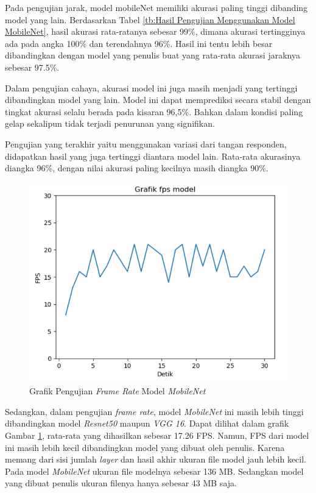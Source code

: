 Pada pengujian jarak, model mobileNet memiliki akurasi paling tinggi dibanding model yang lain. Berdasarkan Tabel \ref{tb:Hasil Pengujian Menggunakan Model MobileNet}, hasil akurasi rata-ratanya sebesar 99\%, dimana akurasi tertingginya ada pada angka 100\% dan terendahnya 96\%. Hasil ini tentu lebih besar dibandingkan dengan model yang penulis buat yang rata-rata akurasi jaraknya sebesar 97.5\%.

Dalam pengujian cahaya, akurasi model ini juga masih menjadi yang tertinggi dibandingkan model yang lain. Model ini dapat memprediksi secara stabil dengan tingkat akurasi selalu berada pada kisaran 96,5\%. Bahkan dalam kondisi paling gelap sekalipun tidak terjadi penurunan yang signifikan. 

Pengujian yang terakhir yaitu menggunakan variasi dari tangan responden, didapatkan hasil yang juga tertinggi diantara model lain. Rata-rata akurasinya diangka 96\%, dengan nilai akurasi paling kecilnya masih diangka 90\%.

\begin{figure}[!htb]
  \centering
  \includegraphics[scale=0.8]{gambar/pengujian-fps/grafik-pengujian-fps-mobilenet.png}
  \caption{Grafik Pengujian \emph{Frame Rate} Model \emph{MobileNet}}
  \label{fig:Grafik Pengujian Frame Rate Model MobileNet}
\end{figure}

Sedangkan, dalam pengujian \emph{frame rate}, model \emph{MobileNet} ini masih lebih tinggi dibandingkan model \emph{Resnet50} maupun \emph{VGG 16}. Dapat dilihat dalam grafik Gambar \ref{fig:Grafik Pengujian Frame Rate Model MobileNet}, rata-rata yang dihasilkan sebesar 17.26 FPS. Namun, FPS dari model ini masih lebih kecil dibandingkan model yang dibuat oleh penulis. Karena memang dari sisi jumlah \emph{layer} dan hasil akhir ukuran file model jauh lebih kecil. Pada model \emph{MobileNet} ukuran file modelnya sebesar 136 MB. Sedangkan model yang dibuat penulis ukuran filenya hanya sebesar 43 MB saja.

